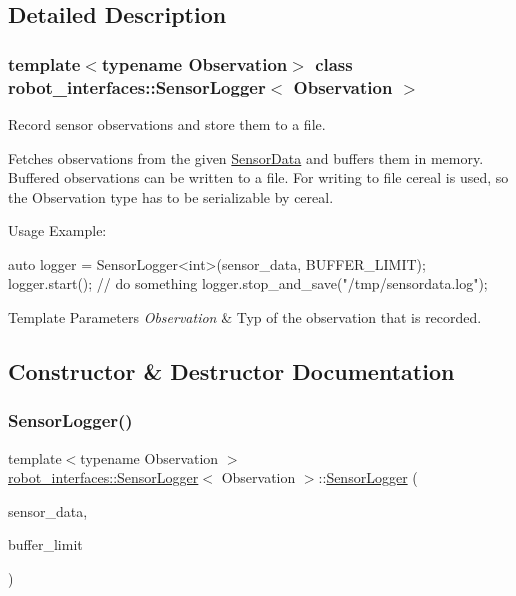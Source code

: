 \subsection{Detailed Description}
\subsubsection*{template$<$typename Observation$>$\newline
class robot\+\_\+interfaces\+::\+Sensor\+Logger$<$ Observation $>$}

Record sensor observations and store them to a file. 

Fetches observations from the given \hyperlink{classrobot__interfaces_1_1SensorData}{Sensor\+Data} and buffers them in memory. Buffered observations can be written to a file. For writing to file cereal is used, so the Observation type has to be serializable by cereal.

Usage Example\+:


\begin{DoxyCode}
\textcolor{keyword}{auto} logger = SensorLogger<int>(sensor\_data, BUFFER\_LIMIT);
logger.start();
\textcolor{comment}{// do something}
logger.stop\_and\_save(\textcolor{stringliteral}{"/tmp/sensordata.log"});
\end{DoxyCode}



\begin{DoxyTemplParams}{Template Parameters}
{\em Observation} & Typ of the observation that is recorded. \\
\hline
\end{DoxyTemplParams}


\subsection{Constructor \& Destructor Documentation}
\mbox{\label{classrobot__interfaces_1_1SensorLogger_aa2b7935cb32b53c49d6c3e541964d968}} 
\subsubsection{\texorpdfstring{Sensor\+Logger()}{SensorLogger()}}
{\footnotesize\ttfamily template$<$typename Observation $>$ \\
\hyperlink{classrobot__interfaces_1_1SensorLogger}{robot\+\_\+interfaces\+::\+Sensor\+Logger}$<$ Observation $>$\+::\hyperlink{classrobot__interfaces_1_1SensorLogger}{Sensor\+Logger} (\begin{DoxyParamCaption}\item[{Data\+Ptr}]{sensor\+\_\+data,  }\item[{size\+\_\+t}]{buffer\+\_\+limit }\end{DoxyParamCaption})\hspace{0.3cm}{\ttfamily [inline]}}



